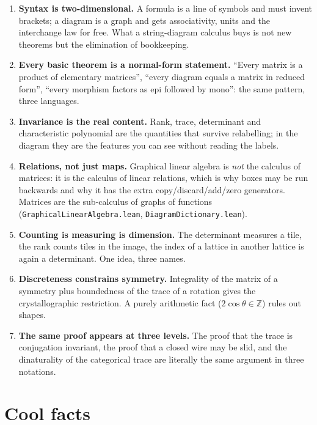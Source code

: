 \documentclass[11pt]{article}
\theoremstyle{definition}
\theoremstyle{plain}
\theoremstyle{remark}
\newcommand{\file}[1]{\texttt{\small #1}}
\newcommand{\Z}{\mathbb{Z}}
\begin{document}
\begin{enumerate}
\item \textbf{Syntax is two-dimensional.}  A formula is a line of symbols and
  must invent brackets; a diagram is a graph and gets associativity, units and
  the interchange law for free.  What a string-diagram calculus buys is not new
  theorems but the elimination of bookkeeping.
\item \textbf{Every basic theorem is a normal-form statement.}  ``Every matrix
  is a product of elementary matrices'', ``every diagram equals a matrix in
  reduced form'', ``every morphism factors as epi followed by mono'': the same
  pattern, three languages.
\item \textbf{Invariance is the real content.}  Rank, trace, determinant and
  characteristic polynomial are the quantities that survive relabelling; in the
  diagram they are the features you can see without reading the labels.
\item \textbf{Relations, not just maps.}  Graphical linear algebra is
  \emph{not} the calculus of matrices: it is the calculus of linear relations,
  which is why boxes may be run backwards and why it has the extra
  copy/discard/add/zero generators.  Matrices are the sub-calculus of graphs of
  functions (\file{GraphicalLinearAlgebra.lean}, \file{DiagramDictionary.lean}).
\item \textbf{Counting is measuring is dimension.}  The determinant measures a
  tile, the rank counts tiles in the image, the index of a lattice in another
  lattice is again a determinant.  One idea, three names.
\item \textbf{Discreteness constrains symmetry.}  Integrality of the matrix of a
  symmetry plus boundedness of the trace of a rotation gives the
  crystallographic restriction.  A purely arithmetic fact ($2\cos\theta\in\Z$)
  rules out shapes.
\item \textbf{The same proof appears at three levels.}  The proof that the
  trace is conjugation invariant, the proof that a closed wire may be slid, and
  the dinaturality of the categorical trace are literally the same argument in
  three notations.
\end{enumerate}

\section{Cool facts}
\end{document}
